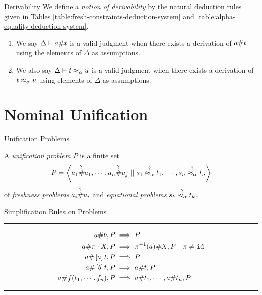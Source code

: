 \documentclass{beamer}
\begin{document}
    \begin{frame}{Derivability}
        We define a \textit{notion of derivability} by the natural deduction rules given in Tables \ref{table:fresh-constraints-deduction-system} and \ref{table:alpha-equality-deduction-system}.
        \begin{enumerate}
            \item We say $\Delta \vdash a \# t$ is a valid judgment when there exists a derivation of $a \# t$  using the elements of $\Delta$ as assumptions.
            \item We also say $\Delta \vdash t \mathrel{\approx_\alpha} u$ is a valid judgment when there exists a derivation of $t \mathrel{\approx_\alpha} u$ using elements of $\Delta$ as assumptions.
        \end{enumerate}
    \end{frame}

    \section{Nominal Unification}
    \begin{frame}{Unification Problems}
        \begin{definition}
            A \textit{unification problem} $P$ is a finite set
            $$P = \left\langle a_1 \overset{?}{\#} u_1, \cdots, a_n \overset{?}{\#} u_j \mid\mid s_1 \overset{?}{\mathrel{\approx_\alpha}} t_1, \cdots , s_n \overset{?}{\mathrel{\approx_\alpha}} t_n \right\rangle$$
            of \textit{freshness problems} $a_i \overset{?}{\#} u_i$ and \textit{equational problems} $s_k \overset{?}{\mathrel{\approx_\alpha}} t_k$.
        \end{definition}
    \end{frame}

    \begin{frame}{Simplification Rules on Problems}
        \begin{table}[ht]
            {\small
                \hrule
                \vspace{10pt}
                \begin{align*}
                    a \# b, P                   & \implies P                                              \\
                    a \# \pi \cdot X, P    & \implies \pi^{-1}(a) \# X, P \quad \pi \neq \mathtt{id} \\
                    a \# \left[ a \right]t, P          & \implies P                                              \\
                    a \# \left[ b \right]t, P          & \implies a \# t, P                                  \\
                    a \# f(t_1, \cdots, f_n), P & \implies a \# t_1, \cdots, a \# t_n, P
                \end{align*}
                \hrule
            }
            \caption{Simplification rules for freshness}
            \label{table:simplification-rules-freshness}
        \end{table}
    \end{frame}
\end{document}
